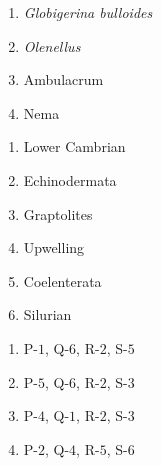 \documentclass[journal,12pt,onecolumn,fleqn]{IEEEtran}
\theoremstyle{remark}
\theoremstyle{remark}
\begin{document}
\begin{enumerate}[label=Q.\arabic*.]
\begin{multicols}{2}
            \begin{enumerate}[label=(\Alph*),start=16]
                \item \textit{Globigerina bulloides}
                \item \textit{Olenellus}
                \item Ambulacrum
                \item Nema
            \end{enumerate}
            \columnbreak
            
            \begin{enumerate}[label=\arabic*.]
                \item Lower Cambrian
                \item Echinodermata
                \item Graptolites
                \item Upwelling
                \item Coelenterata
                \item Silurian
            \end{enumerate}
            

        \end{multicols}
            \begin {enumerate}
                
                    \item P-$1$, Q-$6$, R-$2$, S-$5$
                    \item P-$5$, Q-$6$, R-$2$, S-$3$
                    \item P-$4$, Q-$1$, R-$2$, S-$3$
                    \item P-$2$, Q-$4$, R-$5$, S-$6$
                

\end{enumerate}
\end{enumerate}
\end{document}
